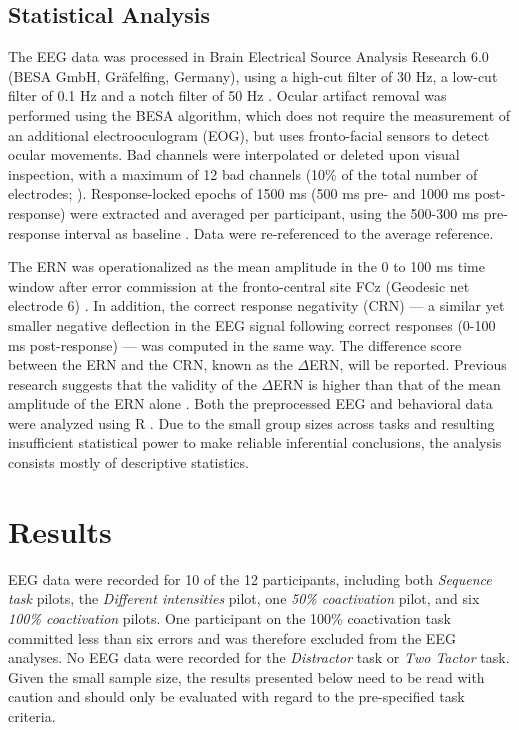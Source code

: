 \documentclass[twocolumn, serif, authordate, empirical]{jote-article}
\begin{document}
 {}\subsection*{Statistical Analysis} 

The EEG data was processed in Brain Electrical Source Analysis Research 6.0 (BESA GmbH, Gräfelfing, Germany), using a high-cut filter of 30 Hz, a low-cut filter of 0.1 Hz and a notch filter of 50 Hz \parencite{Gorka2019}. Ocular artifact removal was performed using the BESA algorithm, which does not require the measurement of an additional electrooculogram (EOG), but uses fronto-facial sensors to detect ocular movements. Bad channels were interpolated or deleted upon visual inspection, with a maximum of 12 bad channels {(}10\% of the total number of electrodes; \parencite{Keil2014}{)}. Response-locked epochs of 1500 ms (500 ms pre- and 1000 ms post-response) were extracted and averaged per participant, using the 500-300 ms pre-response interval as baseline \parencite{Jackson2015, Tan2019, Gorka2019}. Data were re-referenced to the average reference.

The ERN was operationalized as the mean amplitude in the 0 to 100 ms time window after error commission at the fronto-central site FCz (Geodesic net electrode 6) \parencite{Hajcak2019a}. In addition, the correct response negativity (CRN) — a similar yet smaller negative deflection in the EEG signal following correct responses (0-100 ms post-response) — was computed in the same way. The difference score between the ERN and the CRN, known as the $\Delta$ERN, will be reported. Previous research suggests that the validity of the $\Delta$ERN is higher than that of the mean amplitude of the ERN alone \parencite{Riesel2013, Gorka2019}. Both the preprocessed EEG and behavioral data were analyzed using R \parencite{RCoreTeam2013}. Due to the small group sizes across tasks and resulting insufficient statistical power to make reliable inferential conclusions, the analysis consists mostly of descriptive statistics.


 {}\section*{Results} 

EEG data were recorded for 10 of the 12 participants, including both \emph{Sequence task} pilots, the \emph{Different intensities} pilot, one \emph{50\% coactivation} pilot, and six \emph{100\% coactivation}
pilots. One participant on the 100\% coactivation task committed less than six errors and was therefore excluded from the EEG analyses. No EEG data were recorded for the \emph{Distractor} task or \emph{Two Tactor}
task. Given the small sample size, the results presented below need to be read with caution and should only be evaluated with regard to the pre-specified task criteria.
\end{document}
